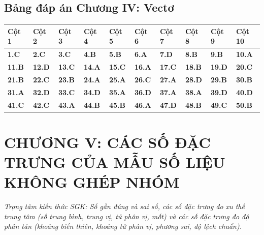 \documentclass[11pt,a4paper]{article}
\begin{document}
\subsection*{\color{primary} Bảng đáp án Chương IV: Vectơ}
\begin{center}
\renewcommand{\arraystretch}{1.25}
\begin{tabularx}{\textwidth}{*{10}{>{\centering\arraybackslash}X}}
\toprule
\textbf{\color{primary} Cột 1} & \textbf{\color{primary} Cột 2} & \textbf{\color{primary} Cột 3} & \textbf{\color{primary} Cột 4} & \textbf{\color{primary} Cột 5} & \textbf{\color{primary} Cột 6} & \textbf{\color{primary} Cột 7} & \textbf{\color{primary} Cột 8} & \textbf{\color{primary} Cột 9} & \textbf{\color{primary} Cột 10} \\
\midrule
\textbf{1.C} & \textbf{2.C} & \textbf{3.C} & \textbf{4.B} & \textbf{5.B} & \textbf{6.A} & \textbf{7.D} & \textbf{8.B} & \textbf{9.B} & \textbf{10.A} \\
\rowcolor{rowtint} \textbf{11.B} & \textbf{12.D} & \textbf{13.C} & \textbf{14.A} & \textbf{15.C} & \textbf{16.A} & \textbf{17.C} & \textbf{18.B} & \textbf{19.D} & \textbf{20.C} \\
\textbf{21.B} & \textbf{22.C} & \textbf{23.B} & \textbf{24.A} & \textbf{25.A} & \textbf{26.C} & \textbf{27.A} & \textbf{28.D} & \textbf{29.B} & \textbf{30.B} \\
\rowcolor{rowtint} \textbf{31.A} & \textbf{32.D} & \textbf{33.C} & \textbf{34.D} & \textbf{35.A} & \textbf{36.D} & \textbf{37.A} & \textbf{38.A} & \textbf{39.D} & \textbf{40.D} \\
\textbf{41.C} & \textbf{42.C} & \textbf{43.A} & \textbf{44.B} & \textbf{45.B} & \textbf{46.A} & \textbf{47.D} & \textbf{48.B} & \textbf{49.C} & \textbf{50.B} \\
\bottomrule
\end{tabularx}
\end{center}\vspace{10pt}
\section*{\color{primary} CHƯƠNG V: CÁC SỐ ĐẶC TRƯNG CỦA MẪU SỐ LIỆU KHÔNG GHÉP NHÓM}
\textit{Trọng tâm kiến thức SGK: Số gần đúng và sai số, các số đặc trưng đo xu thế trung tâm (số trung bình, trung vị, tứ phân vị, mốt) và các số đặc trưng đo độ phân tán (khoảng biến thiên, khoảng tứ phân vị, phương sai, độ lệch chuẩn).}\par\vspace{4pt}
\end{document}
